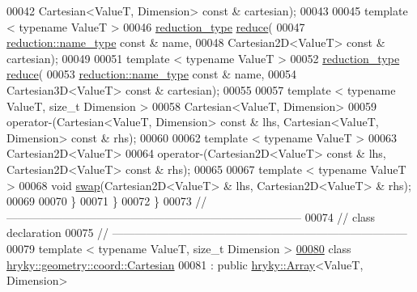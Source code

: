\begin{DoxyCode}
00042         Cartesian<ValueT, Dimension> \textcolor{keyword}{const} & cartesian);
00043 
00045     \textcolor{keyword}{template} < \textcolor{keyword}{typename} ValueT >
00046     \hyperlink{namespacehryky_a343a9a4c36a586be5c2693156200eadc}{reduction_type} \hyperlink{namespacehryky_1_1geometry_a18354ece30244aa68fc3744f2cdb41fc}{reduce}(
00047         \hyperlink{namespacehryky_1_1reduction_ac686c30a4c8d196bbd0f05629a6b921f}{reduction::name_type} \textcolor{keyword}{const} & name,
00048         Cartesian2D<ValueT> \textcolor{keyword}{const} & cartesian);
00049 
00051     \textcolor{keyword}{template} < \textcolor{keyword}{typename} ValueT >
00052     \hyperlink{namespacehryky_a343a9a4c36a586be5c2693156200eadc}{reduction_type} \hyperlink{namespacehryky_1_1geometry_a18354ece30244aa68fc3744f2cdb41fc}{reduce}(
00053         \hyperlink{namespacehryky_1_1reduction_ac686c30a4c8d196bbd0f05629a6b921f}{reduction::name_type} \textcolor{keyword}{const} & name,
00054         Cartesian3D<ValueT> \textcolor{keyword}{const} & cartesian);
00055 
00057     \textcolor{keyword}{template} < \textcolor{keyword}{typename} ValueT, \textcolor{keywordtype}{size\_t} Dimension >
00058     Cartesian<ValueT, Dimension>
00059         operator-(Cartesian<ValueT, Dimension> \textcolor{keyword}{const} & lhs, Cartesian<ValueT,
       Dimension> \textcolor{keyword}{const} & rhs);
00060 
00062     \textcolor{keyword}{template} < \textcolor{keyword}{typename} ValueT >
00063     Cartesian2D<ValueT>
00064         operator-(Cartesian2D<ValueT> \textcolor{keyword}{const} & lhs, Cartesian2D<ValueT> \textcolor{keyword}{const} & 
      rhs);
00065 
00067     \textcolor{keyword}{template} < \textcolor{keyword}{typename} ValueT >
00068     \textcolor{keywordtype}{void} \hyperlink{namespacehryky_1_1geometry_a73028b267b1f3811ebacb86acbee6742}{swap}(Cartesian2D<ValueT> & lhs, Cartesian2D<ValueT> & rhs);
00069 
00070 \}
00071 \}
00072 \}
00073 \textcolor{comment}{//
      ------------------------------------------------------------------------------}
00074 \textcolor{comment}{// class declaration}
00075 \textcolor{comment}{//
      ------------------------------------------------------------------------------}
00079 \textcolor{comment}{}\textcolor{keyword}{template} < \textcolor{keyword}{typename} ValueT, \textcolor{keywordtype}{size\_t} Dimension >
\hypertarget{geometry__coord__cartesian_8h_source_l00080}{}\hyperlink{classhryky_1_1geometry_1_1coord_1_1_cartesian}{00080} \textcolor{keyword}{class }\hyperlink{classhryky_1_1geometry_1_1coord_1_1_cartesian}{hryky::geometry::coord::Cartesian}
00081     : \textcolor{keyword}{public} \hyperlink{classhryky_1_1_array}{hryky::Array}<ValueT, Dimension>

\end{DoxyCode}
